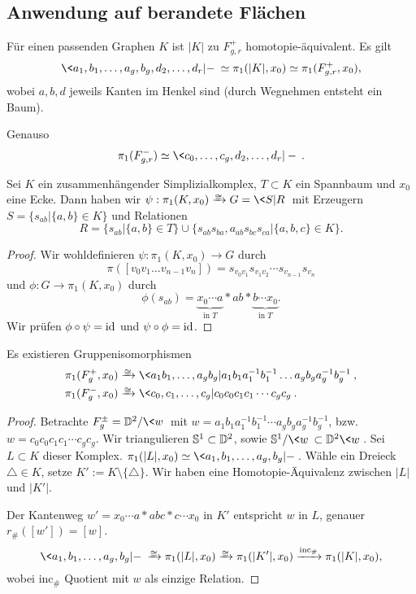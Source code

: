 
\subsection{Anwendung auf berandete Flächen}

Für einen passenden Graphen $K$ ist $|K|$ zu $F_{g,r}^+$ homotopie-äquivalent.
Es gilt
\[
	\<a_1, b_1, \dotsc, a_g, b_g, d_2, \dotsc, d_r | - \>
	\homotopic
	\pi_1(|K|,x_0)
	\homotopic
	\pi_1(F_{g,r}^+, x_0),
\]
wobei $a, b, d$ jeweils Kanten im Henkel sind (durch Wegnehmen entsteht ein Baum).

Genauso
\[
	\pi_1(F_{g,r}^-)
	\homotopic
	\<c_0, \dotsc, c_g, d_2, \dotsc, d_r | - \>.
\]

\begin{st}
	Sei $K$ ein zusammenhängender Simplizialkomplex, $T \subset K$ ein Spannbaum und $x_0$ eine Ecke.
	Dann haben wir $\psi: \pi_1(K, x_0) \isomorphicto G = \<S | R \>$ mit Erzeugern $S = \{ s_{ab} | \{a,b\} \in K\}$ und Relationen
	\[
		R = \{ s_{ab} | \{a,b\} \in T \}
		\cup \Big\{ s_{ab} s_{ba}, a_{ab}s_{bc}s_{ca} | \{a,b,c\} \in K \Big\}.
	\]
	\begin{proof}
		Wir wohldefinieren $\psi: \pi_1(K, x_0) \to G$ durch
		\[
			\pi([v_0v_1 \dotsc v_{n-1} v_n]) = s_{v_0v_1} s_{v_1v_2} \dotsb s_{v_{n-1}}s_{v_n}
		\]
		und $\phi: G \to \pi_1(K, x_0)$ durch
		\[
			\phi(s_{ab}) = \underbrace{x_0 \dotsb a}_{\text{in $T$}} * ab * \underbrace{b \dotsb x_0}_{\text{in $T$}}.
		\]
		Wir prüfen $\phi \circ \psi = \operatorname{id}$ und $\psi \circ \phi = \operatorname{id}$.
	\end{proof}
\end{st}

\begin{st}
	Es existieren Gruppenisomorphismen
	\begin{align*}
		\pi_1(F_g^+, x_0)
		&\isomorphicto \< a_1 b_1, \dotsc, a_g b_g | a_1b_1a_1^{-1}b_1^{-1} \dotsc a_gb_g a_g^{-1}b_g^{-1} \>, \\
		\pi_1(F_g^-, x_0)
		&\isomorphicto \< c_0, c_1, \dotsc, c_g | c_0c_0 c_1c_1 \dotsb c_g c_g \>.
	\end{align*}
	\begin{proof}
		Betrachte $F_{g}^{\pm} = \D^2 / \<w\>$ mit $w = a_1b_1a_1^{-1}b_1^{-1} \dotsb a_gb_g a_g^{-1}b_g^{-1}$, bzw. $w = c_0 c_0 c_1 c_1 \dotsb c_g c_g$.
		Wir triangulieren $\mathbb{S}^1 \subset \mathbb{D}^2$, sowie $\S^1 / \<w\> \subset \D^2 \<w\>$.
		Sei $L \subset K$ dieser Komplex.
		$\pi_1(|L|, x_0) \homotopic \<a_1, b_1, \dotsc, a_g, b_g | - \>$.
		Wähle ein Dreieck $\triangle \in K$, setze $K' := K \setminus \{ \triangle \}$.
		Wir haben eine Homotopie-Äquivalenz zwischen $|L|$ und $|K'|$.

		Der Kantenweg $w' = x_0 \dotsb a * abc * c \dotsb x_0$ in $K'$ entspricht $w$ in $L$, genauer $r_\#([w']) = [w]$.
		\[
			\<a_1, b_1, \dotsc, a_g, b_g | - \>
			\isomorphicto \pi_1(|L|, x_0)
			\isomorphicto \pi_1(|K'|, x_0)
			\xrightarrow{\text{inc}_\#} \pi_1(|K|, x_0),
		\]
		wobei $\text{inc}_\#$ Quotient mit $w$ als einzige Relation.
	\end{proof}
\end{st}

